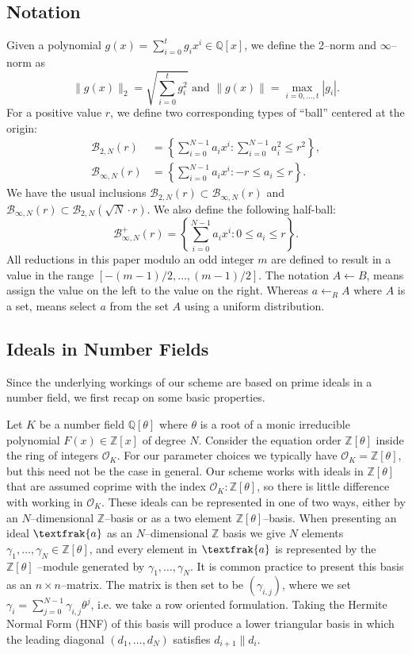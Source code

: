 \documentclass[a4paper, 12pt]{article}
\newcommand{\ndash}{\nobreakdash --}
\newcommand{\bb}[1]{\mathbb{#1}}
\newcommand{\mc}[1]{\mathcal{#1}}
\newcommand{\tfr}[1]{\textfrak{#1}}
\begin{document}
	\subsection{Notation}
	
	Given a polynomial $g(x)=\sum_{i=0}^{t}{g_i x^i} \in \bb{Q}[x]$, we define the 2\ndash norm and $\infty$\ndash norm as
	\[
		\|g(x)\|_2 = \sqrt{\sum_{i=0}^{t}{g_i^2}} \text{ and } \| g(x) \| = \max_{i=0, \dots, t} |g_i|.
	\]
	For a positive value $r$, we define two corresponding types of “ball” centered at the origin:
	\begin{align*}
		\mc{B}_{2, N}(r)&=\left\{ \sum_{i=0}^{N-1}{a_i x^i} : \sum_{i=0}^{N-1}{a_i^2 \le r^2} \right\},\\
		\mc{B}_{\infty, N}(r)&=\left\{ \sum_{i=0}^{N-1}{a_i x^i} : {-r \le a_i \le r} \right\}.
	\end{align*}
	We have the usual inclusions $\mc{B}_{2, N}(r) \subset \mc{B}_{\infty, N}(r)$ and $\mc{B}_{\infty, N}(r) \subset \mc{B}_{2, N}(\sqrt{N} \cdot r)$.
	We also define the following half-ball:
	\[
		\mc{B}_{\infty, N}^{+}(r)=\left\{ \sum_{i=0}^{N-1}{a_i x^i} : {0 \le a_i \le r} \right\}.
	\]
	All reductions in this paper modulo an odd integer $m$ are defined to result in a value in the range $[-(m-1)/2, \ldots, (m-1)/2]$. 
	The notation $A\leftarrow B$, means assign the value on the left to the value on the right. Whereas $a \leftarrow _R A$ where $A$ is a set, means select $a$ from the set $A$ using a uniform distribution.
	
	\subsection{Ideals in Number Fields}
	
	Since the underlying workings of our scheme are based on prime ideals in a number field, we first recap on some basic properties.
	
	Let $K$ be a number field $\bb{Q}[\theta]$ where $\theta$ is a root of a monic irreducible polynomial $F(x) \in \bb{Z}[x]$ of degree $N$.
	Consider the equation order $\bb{Z}[\theta]$ inside the ring of integers $\mc{O}_K$.
	For our parameter choices we typically have $\mc{O}_K = \bb{Z}[\theta]$, but this need not be the case in general.
	Our scheme works with ideals in $\bb{Z}[\theta]$ that are assumed coprime with the index $\mc{O}_K: \bb{Z}[\theta]$, so there is little difference with working in $\mc{O}_K$.
	These ideals can be represented in one of two ways, either by an $N$\ndash dimensional $\bb{Z}$\ndash basis or as a two element $\bb{Z}[\theta]$\ndash basis.
	When presenting an ideal $\tfr{a}$ as an $N$\ndash dimensional $\bb{Z}$ basis we give $N$ elements $\gamma_1, \ldots, \gamma_N \in \bb{Z}[\theta]$, and every element in $\tfr{a}$ is represented by the $\bb{Z}[\theta]$ \ndash module generated by $\gamma_1, \ldots, \gamma_N$.
	It is common practice to present this basis as an $n \times n$\ndash matrix.
	The matrix is then set to be $(\gamma_{i, j})$, where we set $\gamma_i = \sum_{j=0}^{N-1}{\gamma_{i, j}\theta^j}$, i.e. we take a row oriented formulation. 
	Taking the Hermite Normal Form (HNF) of this basis will
	produce a lower triangular basis in which the leading diagonal $(d_1, \ldots, d_N)$ satisfies $d_{i+1}\|d_i$.
	
\end{document}
